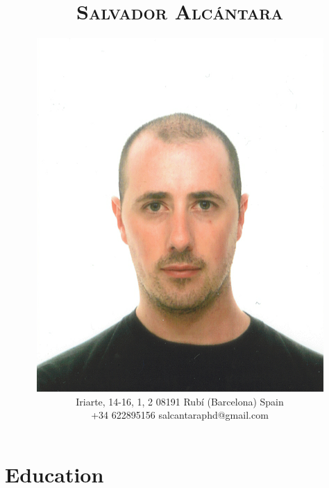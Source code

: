\documentclass[a4paper]{article}
\title{\Large{\textsc{Salvador Alcántara}}\vspace{-0.3cm}} %
\author{\includegraphics[width=.25\textwidth]{input/face.png}\vspace{.3cm}\\
Iriarte, 14-16, 1, 2 \textbar{} 08191 \textbar{} Rubí (Barcelona) \textbar{} Spain\\
+34 622895156 \textbar{} salcantaraphd@gmail.com  \vspace{0.2cm}\\
} %
\date{} %
\begin{document}
\maketitle
\vspace{-1cm}



\section{Education}
\end{document}
